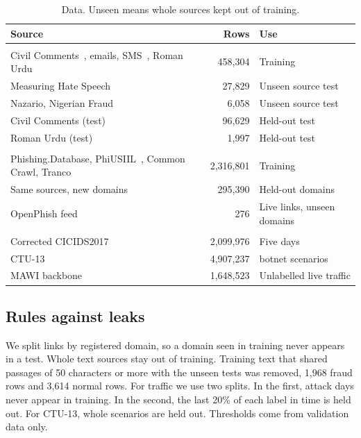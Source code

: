 \begin{table}[t]
\caption{Data. Unseen means whole sources kept out of training.}
\label{tab:data}
\centering
\footnotesize
\begin{tabular}{@{}>{\raggedright\arraybackslash}p{3.7cm}r>{\raggedright\arraybackslash}p{2.75cm}@{}}
\toprule
\textbf{Source} & \textbf{Rows} & \textbf{Use} \\
\midrule
\multicolumn{3}{@{}l}{\emph{Text}} \\
Civil Comments~\cite{civil}, emails, SMS~\cite{smsspam}, Roman Urdu~\cite{ruhsold} & 458,304 & Training \\
Measuring Hate Speech~\cite{mhs} & 27,829 & Unseen source test \\
Nazario, Nigerian Fraud & 6,058 & Unseen source test \\
Civil Comments (test) & 96,629 & Held-out test \\
Roman Urdu (test)~\cite{ruhsold} & 1,997 & Held-out test \\
\multicolumn{3}{@{}l}{\emph{Links}} \\
Phishing.Database, PhiUSIIL~\cite{phiusiil}, Common Crawl, Tranco~\cite{tranco} & 2,316,801 & Training \\
Same sources, new domains & 295,390 & Held-out domains \\
OpenPhish feed & 276 & Live links, unseen domains \\
\multicolumn{3}{@{}l}{\emph{Traffic}} \\
Corrected CICIDS2017~\cite{cicids,engelen} & 2,099,976 & Five days \\
CTU-13~\cite{ctu13} & 4,907,237 & 13 botnet scenarios \\
MAWI backbone~\cite{mawi} & 1,648,523 & Unlabelled live traffic \\
\bottomrule
\end{tabular}
\end{table}

\subsection{Rules against leaks}

We split links by registered domain, so a domain seen in training never appears in a test. Whole text sources stay out of training. Training text that shared passages of 50 characters or more with the unseen tests was removed, 1,968 fraud rows and 3,614 normal rows. For traffic we use two splits. In the first, attack days never appear in training. In the second, the last 20\% of each label in time is held out. For CTU-13, whole scenarios are held out. Thresholds come from validation data only.

